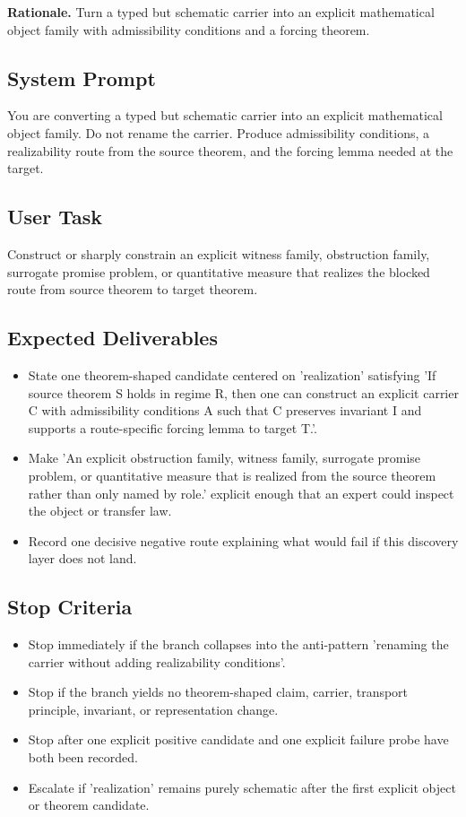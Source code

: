 \documentclass[11pt]{article}
\begin{document}
\textbf{Rationale.} Turn a typed but schematic carrier into an explicit mathematical object family with admissibility conditions and a forcing theorem.

\subsection*{System Prompt}
You are converting a typed but schematic carrier into an explicit mathematical object family. Do not rename the carrier. Produce admissibility conditions, a realizability route from the source theorem, and the forcing lemma needed at the target.

\subsection*{User Task}
Construct or sharply constrain an explicit witness family, obstruction family, surrogate promise problem, or quantitative measure that realizes the blocked route from source theorem to target theorem.

\subsection*{Expected Deliverables}
\begin{itemize}[leftmargin=*,itemsep=0.2em]
\item State one theorem-shaped candidate centered on 'realization' satisfying 'If source theorem S holds in regime R, then one can construct an explicit carrier C with admissibility conditions A such that C preserves invariant I and supports a route-specific forcing lemma to target T.'.
\item Make 'An explicit obstruction family, witness family, surrogate promise problem, or quantitative measure that is realized from the source theorem rather than only named by role.' explicit enough that an expert could inspect the object or transfer law.
\item Record one decisive negative route explaining what would fail if this discovery layer does not land.
\end{itemize}
\subsection*{Stop Criteria}
\begin{itemize}[leftmargin=*,itemsep=0.2em]
\item Stop immediately if the branch collapses into the anti-pattern 'renaming the carrier without adding realizability conditions'.
\item Stop if the branch yields no theorem-shaped claim, carrier, transport principle, invariant, or representation change.
\item Stop after one explicit positive candidate and one explicit failure probe have both been recorded.
\item Escalate if 'realization' remains purely schematic after the first explicit object or theorem candidate.
\end{itemize}
\end{document}
